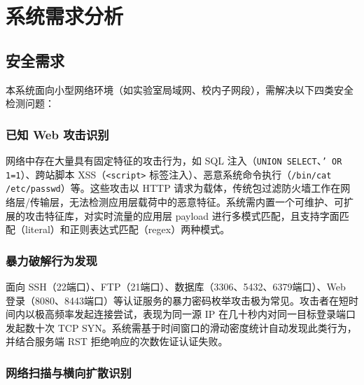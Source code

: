 \documentclass[12pt,a4paper]{ctexart}
\begin{document}

\newpage
{}  %
\tableofcontents
\newpage

\setcounter{page}{1}

\section{系统需求分析}

\subsection{安全需求}

本系统面向小型网络环境（如实验室局域网、校内子网段），需解决以下四类安全检测问题：

\subsubsection{已知 Web 攻击识别}

网络中存在大量具有固定特征的攻击行为，如 SQL 注入（\texttt{UNION SELECT}、\texttt{' OR 1=1}）、跨站脚本 XSS（\texttt{<script>} 标签注入）、恶意系统命令执行（\texttt{/bin/cat /etc/passwd}）等。这些攻击以 HTTP 请求为载体，传统包过滤防火墙工作在网络层/传输层，无法检测应用层载荷中的恶意特征。系统需内置一个可维护、可扩展的攻击特征库，对实时流量的应用层 payload 进行多模式匹配，且支持字面匹配（literal）和正则表达式匹配（regex）两种模式。

\subsubsection{暴力破解行为发现}

面向 SSH（22端口）、FTP（21端口）、数据库（3306、5432、6379端口）、Web 登录（8080、8443端口）等认证服务的暴力密码枚举攻击极为常见。攻击者在短时间内以极高频率发起连接尝试，表现为同一源 IP 在几十秒内对同一目标登录端口发起数十次 TCP SYN。系统需基于时间窗口的滑动密度统计自动发现此类行为，并结合服务端 RST 拒绝响应的次数佐证认证失败。

\subsubsection{网络扫描与横向扩散识别}
\end{document}
